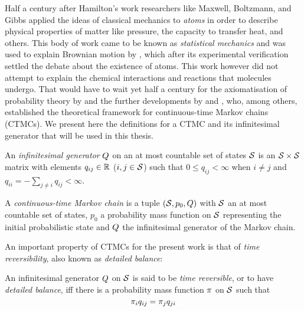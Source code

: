 Half a century after Hamilton's work
researchers like Maxwell, Boltzmann, and Gibbs %
applied the ideas of classical mechanics to \emph{atoms}
in order to describe physical properties of matter like pressure,
the capacity to transfer heat, and others.
This body of work came to be known as \emph{statistical mechanics}
and was used to explain Brownian motion by \citet{einstein-brownian},
which after its experimental verification \citep{perrin}
settled the debate about the existence of atoms.
This work however did not attempt to explain
the chemical interactions and reactions that molecules undergo.
That would have to wait yet half a century
for the axiomatisation of probability theory by \citet{kolmogorov}
and the further developments by \citet{doob} and \citet{feller},
who, among others, established the theoretical framework
for continuous-time Markov chains (CTMCs).
We present here the definitions for a CTMC
and its infinitesimal generator that will be used in this thesis.

\begin{definition}
  An \emph{infinitesimal generator} $Q$
  on an at most countable set of states $\mathcal{S}$
  is an $\mathcal{S} \times \mathcal{S}$ matrix
  with elements $q_{ij} \in \mathbb{R}$ ($i,j \in \mathcal{S}$)
  such that $0 \leqslant q_{ij} < \infty$ when $i \neq j$
  and $q_{ii} = - \sum_{j \neq i} q_{ij} < \infty$.
\end{definition}

\begin{definition}[CTMC]%
  A \emph{continuous-time Markov chain} is a tuple
  $\left(\mathcal{S}, p_0, Q\right)$ with
  $\mathcal{S}$ an at most countable set of states,
  $p_0$ a probability mass function on $\mathcal{S}$
  representing the initial probabilistic state and
  $Q$ the infinitesimal generator of the Markov chain.
\end{definition}

An important property of CTMCs for the present work is that of
\emph{time reversibility}, also known as \emph{detailed balance}:

\begin{definition}
  An infinitesimal generator $Q$ on $\mathcal{S}$ is said to be
  \emph{time reversible}, or to have \emph{detailed balance}, iff
  there is a probability mass function $\pi$ on $\mathcal{S}$ such that
  \begin{equation}
    \label{eq:detailed-balance}
    \pi_i q_{ij} = \pi_j q_{ji}
  \end{equation}
\end{definition}

